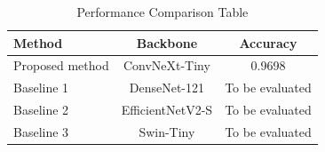 \begin{table}[t]
\caption{Performance Comparison Table}
\label{tab:comparison}
\centering
\begin{tabular}{lcc}
\hline
\textbf{Method} & \textbf{Backbone} & \textbf{Accuracy} \\
\hline
Proposed method & ConvNeXt-Tiny & 0.9698 \\
Baseline 1 & DenseNet-121 & To be evaluated \\
Baseline 2 & EfficientNetV2-S & To be evaluated \\
Baseline 3 & Swin-Tiny & To be evaluated \\
\hline
\end{tabular}
\end{table}
